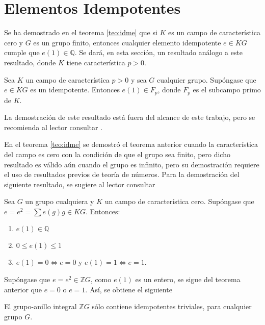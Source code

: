 \section{\quad Elementos Idempotentes}
Se ha demostrado en el teorema \ref{teo:idme} que si $K$ es un campo de característica cero y $G$ es un grupo finito, entonces cualquier elemento idempotente $e \in KG$ cumple que $e(1) \in \mathds{Q}$. Se dará, en esta sección, un resultado análogo a este resultado, donde $K$ tiene característica $p > 0$.

\begin{teorema}\label{teo:genidem}
Sea $K$ un campo de característica $p > 0$ y sea $G$ cualquier grupo. Supóngase que $e \in KG$ es un idempotente. Entonces $e(1) \in F_p$, donde $F_p$ es el subcampo primo de $K$. 
\end{teorema}

La demostración de este resultado está fuera del alcance de este trabajo, pero se recomienda al lector consultar \cite{bib:passman}. 

En el teorema \ref{teo:idme} se demostró el teorema anterior cuando la característica del campo es cero con la condición de que el grupo sea finito, pero dicho resultado es válido aún cuando el grupo es infinito, pero su demostración requiere el uso de resultados previos de teoría de números. Para la demostración del siguiente resultado, se sugiere al lector consultar \cite{bib:passman}

\begin{teorema}\label{teo:genidem23}
Sea $G$ un grupo cualquiera y $K$ un campo de característica cero. Supóngase que $e = e^2 = \sum e(g)g \in KG$. Entonces:
\begin{enumerate}
\item $e(1) \in \mathds{Q}$
\item $0\leq e(1) \leq 1$
\item $e(1) = 0 \Leftrightarrow e= 0 $ y $e(1) = 1 \Leftrightarrow e = 1$. 
\end{enumerate}
\end{teorema} 

Supóngase que $e = e^2 \in \mathds{Z}G$, como $e(1)$ es un entero, se sigue del teorema anterior que $e = 0$ o $e = 1$. Así, se obtiene el siguiente
\begin{corolario}
El grupo-anillo integral $\mathds{Z}G$ sólo contiene idempotentes triviales, para cualquier grupo $G$.
\end{corolario}
